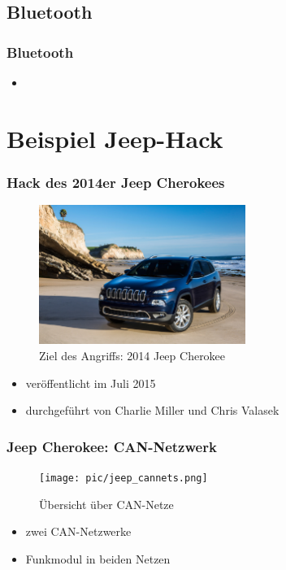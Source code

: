 \documentclass[t]{beamer}
\begin{document}
 \begin{frame}
	\frametitle{WLAN III}
    }]{wlan-pwd.c}

\end{frame}

\subsection{Bluetooth} %

\begin{frame}
	\frametitle{Bluetooth}
    \begin{itemize}
		\item
    \end{itemize}
\end{frame}

\section{Beispiel Jeep-Hack}
\begin{frame}
	\frametitle{Hack des 2014er Jeep Cherokees}
	\begin{figure}
        \includegraphics[width=0.6\textwidth]{pic/2014-jeep-cherokee-1.jpg} %
        \caption{Ziel des Angriffs: 2014 Jeep Cherokee}
    \end{figure}
    \begin{itemize}
		\item veröffentlicht im Juli 2015
        \item durchgeführt von Charlie Miller und Chris Valasek
	\end{itemize}
\end{frame}

\begin{frame}
	\frametitle{Jeep Cherokee: CAN-Netzwerk}
    \begin{figure}
		\texttt{[image: pic/jeep\_cannets.png]}
        \caption{Übersicht über CAN-Netze}
	\end{figure}
    \begin{itemize}
		\item zwei CAN-Netzwerke
        \item Funkmodul in beiden Netzen
	\end{itemize}
\end{frame}
\end{document}
